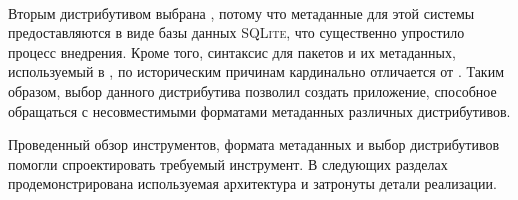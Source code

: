 \paragraph{\fedora}
Вторым дистрибутивом выбрана {\fedora}, потому что метаданные для этой системы предоставляются в виде базы данных \textsc{SQLite}, что существенно упростило процесс внедрения.
Кроме того, синтаксис для пакетов и их метаданных, используемый в {\fedora}, по историческим причинам кардинально отличается от {\debian}. Таким образом, выбор данного дистрибутива позволил создать приложение, способное обращаться с несовместимыми форматами метаданных различных дистрибутивов.

Проведенный обзор инструментов, формата метаданных и выбор дистрибутивов помогли спроектировать требуемый инструмент.
В следующих разделах продемонстрирована используемая архитектура и затронуты детали реализации.

